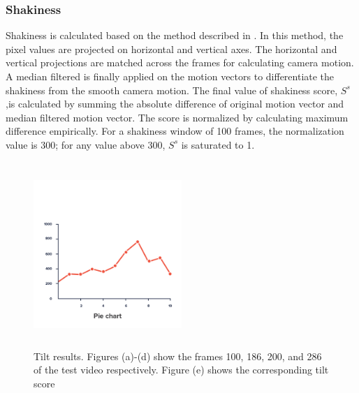 \documentclass{sig-alternate}
\begin{document}
\subsubsection{Shakiness}
Shakiness is calculated based on the method described in \cite{wyszecki1982color}. In this method, the pixel values are projected on horizontal and vertical axes. The horizontal and vertical projections are matched across the frames for calculating camera motion. A median filtered is finally applied on the motion vectors to differentiate the shakiness from the smooth camera motion. The ﬁnal value of shakiness score, \(S^s\),is calculated by summing the absolute difference of original motion vector and median ﬁltered motion vector. The score is normalized by calculating maximum difference empirically. For a shakiness window of 100 frames, the normalization value is 300; for any value above 300, \(S^s\) is saturated to 1.

 \begin{figure}[h]
\includegraphics[width=0.5\textwidth ,height = 7cm]{2}
\caption{Tilt results. Figures (a)-(d) show the frames 100, 186, 200, and 286 of the test video respectively. Figure (e) shows the corresponding tilt score}
\label{fig:figure4}
\end{figure}
\end{document}

